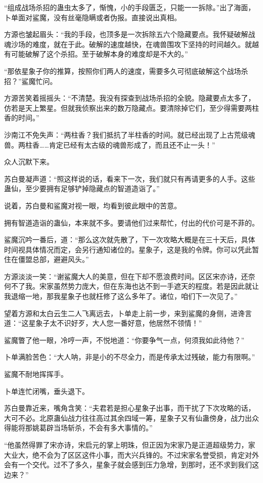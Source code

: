 \begin{this_body}
“组成战场杀招的蛊虫太多了，惭愧，小的手段匮乏，只能一一拆除。”出了海面，卜单面对鲨魔，没有丝毫隐瞒或者伪报。直接说出真相。

方源也皱起眉头：“我的手段，也顶多是一次拆除五六个隐藏要点。我怀疑破解战魂沙场的难度，就在于此。破解的速度越快，在魂兽围攻下坚持的时间越久。就越有可能破解了这个杀招。至于破解本身的难度却是不大的。”

“那依星象子你的推算，按照你们两人的速度，需要多久可彻底破解这个战场杀招？”鲨魔忙问。

方源苦笑着摇摇头：“不清楚。我没有探查到战场杀招的全貌。隐藏要点太多了，仿若是天上繁星。但就我侦察出来的数万隐藏点。要清除掉它们，至少得需要两柱香的时间。”

沙南江不免失声：“两柱香？我们抵抗了半柱香的时间。就已经出现了上古荒级魂兽。两柱香……肯定已经有太古级的魂兽形成了，而且还不止一头！”

众人沉默下来。

苏白曼凝声道：“照这样说的话，看来下一次，我们就只有再请更多的人手。这些蛊仙，至少要拥有足够铲掉隐藏点的智道造诣了。”

说着，苏白曼和鲨魔对视一眼，均看到彼此眼中的苦意。

拥有智道造诣的蛊仙，本来就不多。要请他们过来帮忙，付出的代价可是不菲的。

鲨魔沉吟一番后，道：“那么这次就先散了，下一次攻略大概是在三十天后，具体时间视具体情况而定，会另行通知诸位的。星象子，这是我的令牌。你可以凭此暂住在僵盟总部，避避风头。”

方源淡淡一笑：“谢鲨魔大人的美意，但在下却不愿浪费时间。区区宋亦诗，还奈何不了我。宋家虽然势力庞大，但在东海也达不到一手遮天的程度。若是因此就让我退缩一地，那我星象子也就枉修了这么多年了。诸位，咱们下一次见了。”

望着方源和太白云生二人飞离远去，卜单走上前一步，来到鲨魔的身侧，进谗言道：“这星象子太不识好歹，大人您一番好意，他居然不领情！”

鲨魔瞥了他一眼，冷哼一声，不悦地道：“你要争气一点，何须我如此待他？”

卜单满脸苦色：“大人呐，非是小的不尽全力，而是传承太过残破，能力有限啊。”

鲨魔不耐地挥挥手。

卜单连忙闭嘴，垂头退下。

苏白曼靠近来，嘴角含笑：“夫君若是担心星象子出事，而干扰了下次攻略的话，大可不必。北原蛊仙战力往往高过其余四域一筹，星象子又有仙蛊傍身，战力出众得能将那姚葛辟当场斩杀，不会有多大事情的。”

“他虽然得罪了宋亦诗，宋启元的掌上明珠，但正因为宋家乃是正道超级势力，家大业大，绝不会为了区区这件小事，而大兴兵锋的。不过宋家名誉受损，肯定对外会有一个交代。过不了多久，星象子就会感到压力急增，到那时，还不求到我们这边来？”


\end{this_body}
